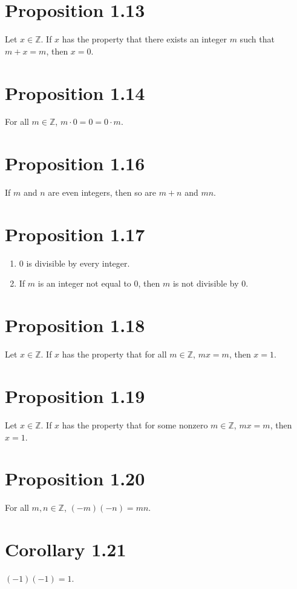 \section*{Proposition 1.13}
Let $x \in \mathbb{Z}$. If $x$ has the property that there exists an integer $m$ such that $m+x = m$, then $x = 0$.

\section*{Proposition 1.14}
For all $m \in \mathbb{Z}$, $m \cdot 0 = 0 = 0 \cdot m$.

\section*{Proposition 1.16}
If $m$ and $n$ are even integers, then so are $m+n$ and $mn$.

\section*{Proposition 1.17}
\begin{enumerate}[label=(\roman*)]
    \item $0$ is divisible by every integer.
    \item If $m$ is an integer not equal to $0$, then $m$ is not divisible by $0$.
\end{enumerate}

\section*{Proposition 1.18}
Let $x \in \mathbb{Z}$. If $x$ has the property that for all $m \in \mathbb{Z}$, $mx = m$, then $x=1$.

\section*{Proposition 1.19}
Let $x \in \mathbb{Z}$. If $x$ has the property that for some nonzero $m \in \mathbb{Z}$, $mx = m$, then $x = 1$.

\section*{Proposition 1.20}
For all $m, n \in \mathbb{Z}$, $(-m)(-n) = mn$.

\section*{Corollary 1.21}
$(-1)(-1) = 1$.

